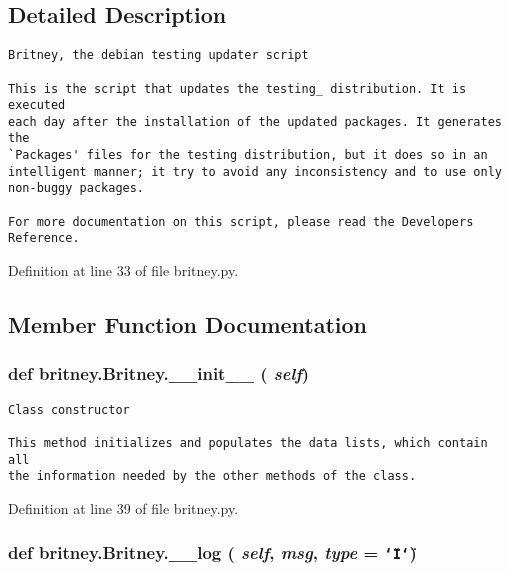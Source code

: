 \subsection{Detailed Description}


\footnotesize\begin{verbatim}Britney, the debian testing updater script

This is the script that updates the testing_ distribution. It is executed
each day after the installation of the updated packages. It generates the 
`Packages' files for the testing distribution, but it does so in an
intelligent manner; it try to avoid any inconsistency and to use only
non-buggy packages.

For more documentation on this script, please read the Developers Reference.
\end{verbatim}
\normalsize
 



Definition at line 33 of file britney.py.

\subsection{Member Function Documentation}
\subsubsection{\setlength{\rightskip}{0pt plus 5cm}def britney.Britney.\_\-\_\-init\_\-\_\- ( {\em self})}\label{classbritney_1_1Britney_5846d81eace24f479292c47e30fd1851}




\footnotesize\begin{verbatim}Class constructor

This method initializes and populates the data lists, which contain all
the information needed by the other methods of the class.
\end{verbatim}
\normalsize
 

Definition at line 39 of file britney.py.
\subsubsection{\setlength{\rightskip}{0pt plus 5cm}def britney.Britney.\_\-\_\-log ( {\em self},  {\em msg},  {\em type} = {\tt \char`\"{}I\char`\"{}})}\label{classbritney_1_1Britney_678036a5200302d77249f5e702532681}




